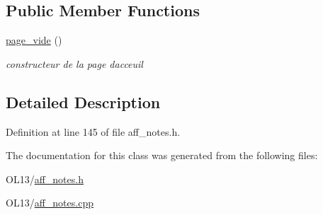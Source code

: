 \subsection*{Public Member Functions}
\begin{DoxyCompactItemize}
\item 
\mbox{\label{classpage__vide_a179cdfb1ca970cd7276b7e7d640ad182}} 
\hyperlink{classpage__vide_a179cdfb1ca970cd7276b7e7d640ad182}{page\+\_\+vide} ()
\begin{DoxyCompactList}\small\item\em constructeur de la page d\textquotesingle{}acceuil \end{DoxyCompactList}\end{DoxyCompactItemize}


\subsection{Detailed Description}


Definition at line 145 of file aff\+\_\+notes.\+h.



The documentation for this class was generated from the following files\+:\begin{DoxyCompactItemize}
\item 
O\+L13/\hyperlink{aff__notes_8h}{aff\+\_\+notes.\+h}\item 
O\+L13/\hyperlink{aff__notes_8cpp}{aff\+\_\+notes.\+cpp}\end{DoxyCompactItemize}
